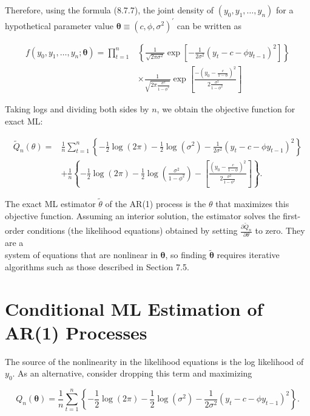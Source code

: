 \documentclass[10pt]{article}
\begin{document}
Therefore, using the formula (8.7.7), the joint density of $\left(y_{0}, y_{1}, \ldots, y_{n}\right)$ for a hypothetical parameter value $\boldsymbol{\theta} \equiv\left(c, \phi, \sigma^{2}\right)^{\prime}$ can be written as


\begin{align*}
f\left(y_{0}, y_{1}, \ldots, y_{n} ; \boldsymbol{\theta}\right)=\prod_{t=1}^{n} & \left\{\frac{1}{\sqrt{2 \pi \sigma^{2}}} \exp \left[-\frac{1}{2 \sigma^{2}}\left(y_{t}-c-\phi y_{t-1}\right)^{2}\right]\right\} \\
& \times \frac{1}{\sqrt{2 \pi \frac{\sigma^{2}}{1-\phi^{2}}}} \exp \left[\frac{-\left(y_{0}-\frac{c}{1-\phi}\right)^{2}}{2 \frac{\sigma^{2}}{1-\phi^{2}}}\right] \tag{8.7.12}
\end{align*}


Taking logs and dividing both sides by $n$, we obtain the objective function for exact ML:


\begin{align*}
\widetilde{Q}_{n}(\theta)= & \frac{1}{n} \sum_{t=1}^{n}\left\{-\frac{1}{2} \log (2 \pi)-\frac{1}{2} \log \left(\sigma^{2}\right)-\frac{1}{2 \sigma^{2}}\left(y_{t}-c-\phi y_{t-1}\right)^{2}\right\} \\
& +\frac{1}{n}\left\{-\frac{1}{2} \log (2 \pi)-\frac{1}{2} \log \left(\frac{\sigma^{2}}{1-\phi^{2}}\right)-\left[\frac{\left(y_{0}-\frac{c}{1-\phi}\right)^{2}}{2 \frac{\sigma^{2}}{1-\phi^{2}}}\right]\right\} . \tag{8.7.13}
\end{align*}


The exact ML estimator $\tilde{\theta}$ of the AR(1) process is the $\theta$ that maximizes this objective function. Assuming an interior solution, the estimator solves the first-order conditions (the likelihood equations) obtained by setting $\frac{\partial \widetilde{Q}_{n}}{\partial \theta}$ to zero. They are a\\
system of equations that are nonlinear in $\boldsymbol{\theta}$, so finding $\tilde{\boldsymbol{\theta}}$ requires iterative algorithms such as those described in Section 7.5.

\section*{Conditional ML Estimation of AR(1) Processes}
The source of the nonlinearity in the likelihood equations is the log likelihood of $y_{0}$. As an alternative, consider dropping this term and maximizing


\begin{equation*}
Q_{n}(\boldsymbol{\theta})=\frac{1}{n} \sum_{t=1}^{n}\left\{-\frac{1}{2} \log (2 \pi)-\frac{1}{2} \log \left(\sigma^{2}\right)-\frac{1}{2 \sigma^{2}}\left(y_{t}-c-\phi y_{t-1}\right)^{2}\right\} . \tag{8.7.14}
\end{equation*}
\end{document}
